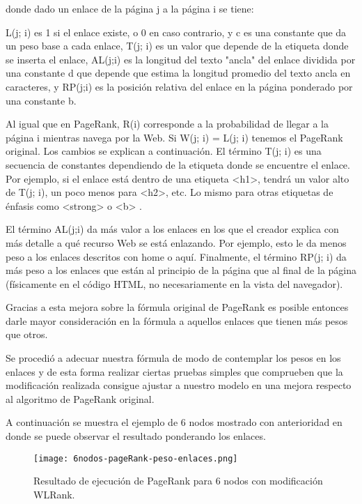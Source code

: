 donde dado un enlace de la página j a la página i se tiene:

L(j; i) es 1 si el enlace existe, o 0 en caso contrario, y c es una constante que da un peso base a cada enlace,
T(j; i) es un valor que depende de la etiqueta donde se inserta el enlace,
AL(j;i) es la longitud del texto "ancla" del enlace dividida por una constante d que depende que estima la longitud promedio del texto ancla en caracteres, y RP(j;i) es la posición relativa del enlace en la página ponderado por una constante b.

Al igual que en PageRank, R(i) corresponde a la probabilidad de llegar a la página i mientras navega por la Web. Si W(j; i) = L(j; i) tenemos el PageRank original. Los cambios se explican a continuación. El término T(j; i) es una secuencia de constantes dependiendo de la etiqueta donde se encuentre el enlace. Por ejemplo, si el enlace está dentro de una etiqueta <h1>, tendrá un valor alto de T(j; i), un poco menos para <h2>, etc. Lo mismo para otras etiquetas de énfasis como <strong> o <b> .

El término AL(j;i) da más valor a los enlaces en los que el creador explica con más detalle a qué recurso Web se está enlazando. Por ejemplo, esto le da menos peso a los enlaces descritos con home o aquí. Finalmente, el término RP(j; i) da más peso a los enlaces que están al principio de la página que al final de la página (físicamente en el código HTML, no necesariamente en la vista del navegador).

Gracias a esta mejora sobre la fórmula original de PageRank es posible entonces darle mayor consideración en la fórmula a aquellos enlaces que tienen más pesos que otros.

Se procedió a adecuar nuestra fórmula de modo de contemplar los pesos en los enlaces y de esta forma realizar ciertas pruebas simples que comprueben que la modificación realizada consigue ajustar a nuestro modelo en una mejora respecto al algoritmo de PageRank original.

A continuación se muestra el ejemplo de 6 nodos mostrado con anterioridad en donde se puede observar el resultado ponderando los enlaces.

\begin{figure}
	\centering
	\texttt{[image: 6nodos-pageRank-peso-enlaces.png]}
	\caption{Resultado de ejecución de PageRank para 6 nodos con modificación WLRank.} 
	\label{fig:6nodos-pageRank-peso-enlaces}
\end{figure}

